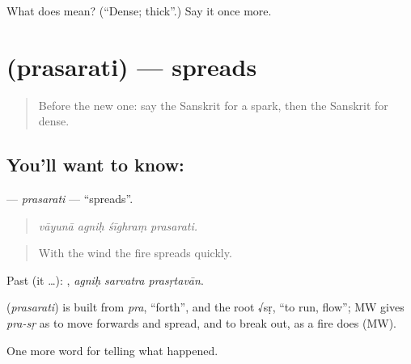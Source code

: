 \begin{tcolorbox}[breakable,colback=teal!4,colframe=teal!35!black,title={Before you move on}]
What does  mean? (\textquotedblleft{}Dense; thick\textquotedblright{}.) Say it once more.
\end{tcolorbox}
\section[\texorpdfstring{\sk{प्रसरति} (prasarati)}{प्रसरति (prasarati)}]{ (prasarati) — spreads}

\label{lesson:SA-C296-prasarati}



\begin{quote}
Before the new one: say the Sanskrit for a spark, then the Sanskrit for dense.
\end{quote}

\subsection*{You'll want to know: }
\textbf{} — \emph{prasarati} — \textquotedblleft{}spreads\textquotedblright{}.

\begin{quote}
   
\end{quote}

\begin{quote}
\emph{vāyunā agniḥ śīghraṃ prasarati.}
\end{quote}

\begin{quote}
With the wind the fire spreads quickly.
\end{quote}

Past (it …):   , \emph{agniḥ sarvatra prasṛtavān}.

\begin{cousinweb}
\textbf{} (\emph{prasarati}) is built from \emph{pra}, \textquotedblleft{}forth\textquotedblright{}, and the root √sṛ, \textquotedblleft{}to run, flow\textquotedblright{}; MW gives \emph{pra-sṛ} as to move forwards and spread, and to break out, as a fire does (MW).
\end{cousinweb}

\begin{grammarlens}[title={What you've built}]
One more word for telling what happened.
\end{grammarlens}

